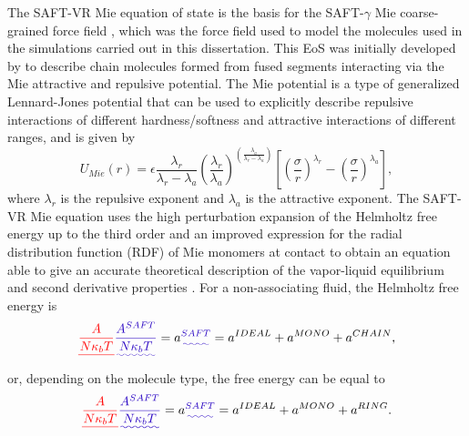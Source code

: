 \documentclass[
	12pt,				%
	openany,			%
	oneside,			%
	a4paper,			%
	english,			%
	brazil				%
	]{abntex2}
\providecommand{\DIFadd}[1]{{\protect\color{blue}\uwave{#1}}}
\providecommand{\DIFdel}[1]{{\protect\color{red}\sout{#1}}}
\providecommand{\DIFaddbegin}{}
\providecommand{\DIFaddend}{}
\providecommand{\DIFdelbegin}{}
\providecommand{\DIFdelend}{}
\providecommand{\DIFadd}[1]{{\protect\color{blue}\uwave{#1}}} %
\providecommand{\DIFdel}[1]{{\protect\color{red}\sout{#1}}}                      %
\providecommand{\DIFaddbegin}{} %
\providecommand{\DIFaddend}{} %
\providecommand{\DIFdelbegin}{} %
\providecommand{\DIFdelend}{} %
\begin{document}
The SAFT-VR Mie equation of state \cite{lafitte2013} is the basis for the SAFT-$\gamma$ Mie coarse-grained force field \cite{avendano2011}, which was the force field used to model the molecules used in the simulations carried out in this dissertation. This EoS was initially developed by  to describe chain molecules formed from fused segments interacting via the Mie attractive and repulsive potential. The Mie potential is a type of generalized Lennard-Jones potential that can be used to explicitly describe repulsive interactions of different hardness/softness and attractive interactions of different ranges, and is given by
\begin{equation}
U_{Mie}(r) = \epsilon\frac{\lambda_r}{\lambda_r - \lambda_a} \left(\frac{\lambda_r}{\lambda_a} \right)^{\left( \frac{\lambda_a}{\lambda_r - \lambda_a} \right)}
\left[ \left(\frac{\sigma}{r} \right)^{\lambda_r} - \left(\frac{\sigma}{r} \right)^{\lambda_a} \right],
\label{eqn:miepotential}
\end{equation}
where $\lambda_r$ is the repulsive exponent and $\lambda_a$ is the attractive exponent. The SAFT-VR Mie equation uses the  high perturbation expansion of the Helmholtz free energy up to the third order and an improved expression for the  radial distribution function (RDF) of Mie monomers at contact to obtain an equation able to give an accurate theoretical description of the vapor-liquid equilibrium and second derivative properties \cite{lafitte2013}. For a non-associating fluid, the Helmholtz free energy is
\begin{equation}
\DIFdelbegin \DIFdel{\frac{A}{N\kappa_{b}T} }\DIFdelend \DIFaddbegin \DIFadd{\frac{A^{SAFT}}{N\kappa_{b}T} }\DIFaddend = a\DIFaddbegin \DIFadd{^{SAFT} }\DIFaddend = a^{IDEAL} + a^{MONO} + a^{CHAIN}, 
\label{eqn:miehelm}
\end{equation}
or, depending on the molecule type, the free energy can be equal to
\begin{equation}
\DIFdelbegin \DIFdel{\frac{A}{N\kappa_{b}T} }\DIFdelend \DIFaddbegin \DIFadd{\frac{A^{SAFT}}{N\kappa_{b}T} }\DIFaddend = a\DIFaddbegin \DIFadd{^{SAFT} }\DIFaddend = a^{IDEAL} + a^{MONO} + a^{RING}.
\label{eqn:miehelmring}
\end{equation}
\end{document}
